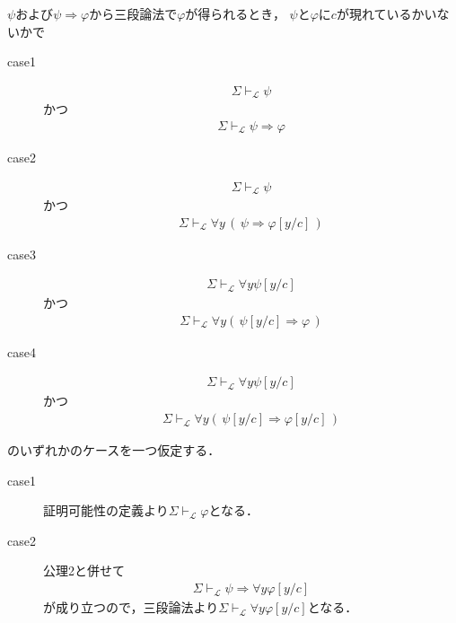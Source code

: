 	\begin{sketch}
		$\psi$および$\psi \Longrightarrow \varphi$から三段論法で$\varphi$が得られるとき，
		$\psi$と$\varphi$に$c$が現れているかいないかで
		\begin{description}
			\item[case1]
				\begin{align}
					\Sigma \vdash_{\mathcal{L}} \psi
				\end{align}
				かつ
				\begin{align}
					\Sigma \vdash_{\mathcal{L}} \psi \Longrightarrow \varphi
				\end{align}
			
			\item[case2]
				\begin{align}
					\Sigma \vdash_{\mathcal{L}} \psi
				\end{align}
				かつ
				\begin{align}
					\Sigma \vdash_{\mathcal{L}} \forall y\, (\, \psi \Longrightarrow \varphi[y/c]\, )
				\end{align}
				
			\item[case3]
				\begin{align}
					\Sigma \vdash_{\mathcal{L}} \forall y \psi[y/c]
				\end{align}
				かつ
				\begin{align}
					\Sigma \vdash_{\mathcal{L}} \forall y (\, \psi[y/c] \Longrightarrow \varphi\, )
				\end{align}
			
			\item[case4]
				\begin{align}
					\Sigma \vdash_{\mathcal{L}} \forall y \psi[y/c]
				\end{align}
				かつ
				\begin{align}
					\Sigma \vdash_{\mathcal{L}} \forall y (\, \psi[y/c] \Longrightarrow \varphi[y/c]\, )
				\end{align}
		\end{description}
		のいずれかのケースを一つ仮定する．
		\begin{description}
			\item[case1]
				証明可能性の定義より$\Sigma \vdash_{\mathcal{L}} \varphi$となる．
			
			\item[case2]
				公理2と併せて
				\begin{align}
					\Sigma \vdash_{\mathcal{L}} \psi \Longrightarrow \forall y \varphi[y/c]
				\end{align}
				が成り立つので，三段論法より$\Sigma \vdash_{\mathcal{L}} 
				\forall y \varphi[y/c]$となる．
				

\end{description}
\end{sketch}
